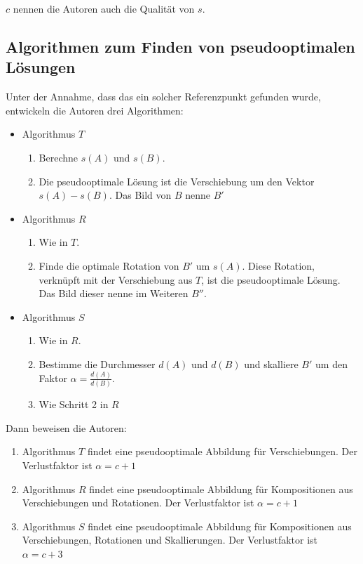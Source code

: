 $c$ nennen die Autoren auch die Qualität von $s$.

\subsection{Algorithmen zum Finden von pseudooptimalen Lösungen}

Unter der Annahme, dass das ein solcher Referenzpunkt gefunden wurde, entwickeln die Autoren drei Algorithmen:
\begin{itemize}
\item Algorithmus $T$
\begin{enumerate}
\item Berechne $s(A)$ und $s(B)$.
\item Die pseudooptimale Lösung ist die Verschiebung um den Vektor $s(A)-s(B)$. Das Bild von $B$ nenne $B'$
\end{enumerate}

\item Algorithmus $R$
\begin{enumerate}
\item Wie in $T$.
\item Finde die optimale Rotation von $B'$ um $s(A)$. Diese Rotation, verknüpft mit der Verschiebung aus $T$, ist die pseudooptimale Lösung. Das Bild dieser nenne im Weiteren $B''$.

\end{enumerate}
\item Algorithmus $S$
\begin{enumerate}
\item Wie in $R$.
\item Bestimme die Durchmesser $d(A)$ und $d(B)$ und skalliere $B'$ um den Faktor $\alpha =\frac{d(A)}{d(B)}$.
\item Wie Schritt 2 in $R$ 
\end{enumerate}
\end{itemize}

Dann beweisen die Autoren:
\begin{enumerate}
\item Algorithmus $T$ findet eine pseudooptimale Abbildung für Verschiebungen. Der Verlustfaktor ist $\alpha=c+1$
\item Algorithmus $R$ findet eine pseudooptimale Abbildung für Kompositionen aus Verschiebungen und Rotationen.  Der Verlustfaktor ist $\alpha=c+1$
\item Algorithmus $S$ findet eine pseudooptimale Abbildung für Kompositionen aus Verschiebungen, Rotationen und Skallierungen. Der Verlustfaktor ist $\alpha=c+3$
\end{enumerate}

